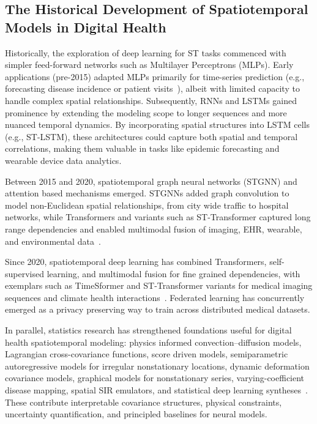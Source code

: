 \documentclass[journal]{IEEEtran}
\begin{document}
\subsection{The Historical Development of Spatiotemporal Models in Digital Health}
Historically, the exploration of deep learning for ST tasks commenced with simpler feed-forward networks such as Multilayer Perceptrons (MLPs). Early applications (pre-2015) adapted MLPs primarily for time-series prediction (e.g., forecasting disease incidence or patient visits~\cite{miotto2018deeplearning}), albeit with limited capacity to handle complex spatial relationships. Subsequently, RNNs and LSTMs gained prominence by extending the modeling scope to longer sequences and more nuanced temporal dynamics. By incorporating spatial structures into LSTM cells (e.g., ST-LSTM), these architectures could capture both spatial and temporal correlations, making them valuable in tasks like epidemic forecasting and wearable device data analytics.

Between 2015 and 2020, spatiotemporal graph neural networks (STGNN) and attention based mechanisms emerged. STGNNs added graph convolution to model non-Euclidean spatial relationships, from city wide traffic to hospital networks, while Transformers and variants such as ST-Transformer captured long range dependencies and enabled multimodal fusion of imaging, EHR, wearable, and environmental data~\cite{caroprese2018deepehr}.

Since 2020, spatiotemporal deep learning has combined Transformers, self-supervised learning, and multimodal fusion for fine grained dependencies, with exemplars such as TimeSformer and ST-Transformer variants for medical imaging sequences and climate health interactions~\cite{liu2024temporallearning}. Federated learning has concurrently emerged as a privacy preserving way to train across distributed medical datasets.

In parallel, statistics research has strengthened foundations useful for digital health spatiotemporal modeling: physics informed convection--diffusion models, Lagrangian cross-covariance functions, score driven models, semiparametric autoregressive models for irregular nonstationary locations, dynamic deformation covariance models, graphical models for nonstationary series, varying-coefficient disease mapping, spatial SIR emulators, and statistical deep learning syntheses~\cite{liu2022convectionDiffusion,salvana2023lagrangian,gasperoni2023scoreDriven,lu2024dyfast,castroMorales2025dynamicDeformation,basu2023graphicalNonstationary,wang2024respiratoryDiseaseMapping,trostle2024spatialSIR,wikle2023statisticalDeepLearning}. These contribute interpretable covariance structures, physical constraints, uncertainty quantification, and principled baselines for neural models.
\end{document}
